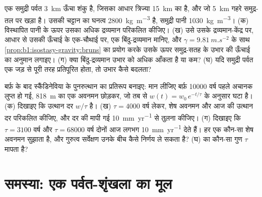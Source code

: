 \begin{exercise}[$\star\star\star$]\label{exo:b1:isostasy-gravity:11}
एक समुद्री पर्वत \qty{3}{km} ऊँचा शंकु है, जिसका आधार त्रिज्या \qty{15}{km} का है, और जो \qty{5}{km} गहरे समुद्र-तल पर खड़ा है। उसकी चट्टान का घनत्व \qty{2800}{kg.m^{-3}} है, समुद्री पानी \qty{1030}{kg.m^{-3}}। (क) विस्थापित पानी के ऊपर उसका अधिक द्रव्यमान परिकलित कीजिए। (ख) उसे उसके द्रव्यमान-केंद्र पर, आधार से उसकी ऊँचाई के एक-चौथाई पर, एक बिंदु-द्रव्यमान मानिए, और $\gamma = \qty{9.81}{m.s^{-2}}$ के साथ \cref{prop:b1:isostasy-gravity:bruns} का प्रयोग करके उसके ऊपर समुद्र-सतह के उभार की ऊँचाई का अनुमान लगाइए। (ग) क्या बिंदु-द्रव्यमान उभार को अधिक आँकता है या कम? (घ) यदि समुद्री पर्वत एक जड़ से पूरी तरह प्रतिपूरित होता, तो उभार कैसे बदलता?
\end{exercise}

\begin{exercise}[$\star\star\star$]\label{exo:b1:isostasy-gravity:12}
बर्फ़ के बाद स्कैंडिनेविया के पुनरुत्थान का प्रतिरूप बनाइए: मान लीजिए बर्फ़ \num{10000} वर्ष पहले अचानक लुप्त हो गई, \qty{818}{m} का एक अवनमन छोड़कर, जो तब से $w(t) = w_0\,e^{-t/\tau}$ के अनुसार घटा है। (क) दिखाइए कि उत्थान दर $w/\tau$ है। (ख) $\tau = \num{4000}$ वर्ष लेकर, शेष अवनमन और आज की उत्थान दर परिकलित कीजिए, और दर की मापी गई \qty{10}{mm.yr^{-1}} से तुलना कीजिए। (ग) दिखाइए कि $\tau = \num{3100}$ वर्ष और $\tau = \num{68000}$ वर्ष दोनों आज लगभग \qty{10}{mm.yr^{-1}} देते हैं। हर एक कौन-सा शेष अवनमन सुझाता है, और गुरुत्व सर्वेक्षण उनके बीच कैसे निर्णय ले सकता है? (घ)  का कौन-सा गुण $\tau$ मापता है?
\end{exercise}

\section{समस्या: एक पर्वत-शृंखला का मूल}

